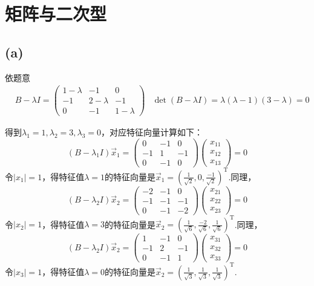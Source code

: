 \documentclass[UTF8]{ctexart}
\begin{document}
\section{矩阵与二次型}
\subsection*{(a)}
依题意\begin{equation*}
    \begin{aligned}
        &B-\lambda I=\begin{pmatrix}
            1-\lambda&-1&0\\
            -1&2-\lambda&-1\\
            0&-1&1-\lambda
        \end{pmatrix}  
        &\det(B-\lambda I)=\lambda(\lambda-1)(3-\lambda)=0
    \end{aligned}
\end{equation*}

得到$\lambda_1=1,\lambda_2=3,\lambda_3=0$，对应特征向量计算如下：
\begin{equation*}
    (B-\lambda_1 I)\vec{x}_1=\begin{pmatrix}
        0&-1&0\\
        -1&1&-1\\
        0&-1&0
    \end{pmatrix}
    \begin{pmatrix}
        x_{11}\\x_{12}\\x_{13}
    \end{pmatrix}=0  
\end{equation*}
令$|x_{1}|=1$，得特征值$\lambda=1$的特征向量是$\vec{x}_1=(\frac{1}{\sqrt{2}},0,\frac{-1}{\sqrt{2}})^\mathrm{T}$.同理，\begin{equation*}
    (B-\lambda_2 I)\vec{x}_2=\begin{pmatrix}
        -2&-1&0\\
        -1&-1&-1\\
        0&-1&-2
    \end{pmatrix}
    \begin{pmatrix}
        x_{21}\\x_{22}\\x_{23}
    \end{pmatrix}=0  
\end{equation*}
令$|x_{2}|=1$，得特征值$\lambda=3$的特征向量是$\vec{x}_2=(\frac{1}{\sqrt{6}},\frac{-2}{\sqrt{6}},\frac{1}{\sqrt{6}})^\mathrm{T}$.同理，\begin{equation*}
    (B-\lambda_2 I)\vec{x}_2=\begin{pmatrix}
        1&-1&0\\
        -1&2&-1\\
        0&-1&1
    \end{pmatrix}
    \begin{pmatrix}
        x_{31}\\x_{32}\\x_{33}
    \end{pmatrix}=0  
\end{equation*}
令$|x_{3}|=1$，得特征值$\lambda=0$的特征向量是$\vec{x}_2=(\frac{1}{\sqrt{3}},\frac{1}{\sqrt{3}},\frac{1}{\sqrt{3}})^\mathrm{T}$.
\end{document}
